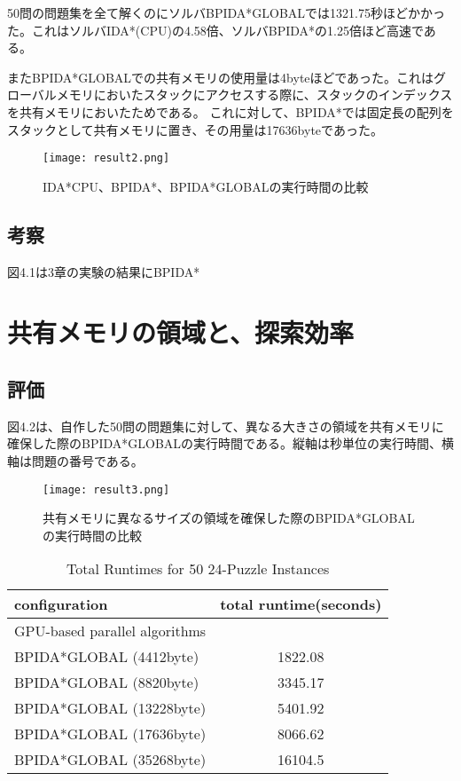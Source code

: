 \documentclass[a4paper,11pt,oneside,openany]{jsbook}
\begin{document}
50問の問題集を全て解くのにソルバBPIDA*GLOBALでは1321.75秒ほどかかった。これはソルバIDA*(CPU)の4.58倍、ソルバBPIDA*の1.25倍ほど高速である。

またBPIDA*GLOBALでの共有メモリの使用量は4byteほどであった。これはグローバルメモリにおいたスタックにアクセスする際に、スタックのインデックスを共有メモリにおいたためである。
これに対して、BPIDA*では固定長の配列をスタックとして共有メモリに置き、その用量は17636byteであった。

\begin{figure}[hbtp]
\begin{center}
\texttt{[image: result2.png]}
\caption{IDA*CPU、BPIDA*、BPIDA*GLOBALの実行時間の比較}
\end{center}
\end{figure}

\subsection{考察}
図4.1は3章の実験の結果にBPIDA*


\section{共有メモリの領域と、探索効率}
\subsection{評価}
図4.2は、自作した50問の問題集に対して、異なる大きさの領域を共有メモリに確保した際のBPIDA*GLOBALの実行時間である。縦軸は秒単位の実行時間、横軸は問題の番号である。

\begin{figure}[hbtp]
\begin{center}
\texttt{[image: result3.png]}
\caption{共有メモリに異なるサイズの領域を確保した際のBPIDA*GLOBALの実行時間の比較}
\end{center}
\end{figure}

\begin{table}[]
\centering
\caption{Total Runtimes for 50 24-Puzzle Instances}
\label{my-label}
\begin{tabular}{|l|c|}
\hline
configuration & \multicolumn{1}{l|}{total runtime(seconds)} \\ \hline
\multicolumn{2}{|l|}{GPU-based parallel algorithms} \\ \hline
BPIDA*GLOBAL (4412byte) & 1822.08  \\
BPIDA*GLOBAL (8820byte) &  3345.17 \\
BPIDA*GLOBAL (13228byte) & 5401.92 \\
BPIDA*GLOBAL (17636byte) & 8066.62 \\
BPIDA*GLOBAL (35268byte) & 16104.5 \\ \hline
\end{tabular}
\end{table}
\end{document}
